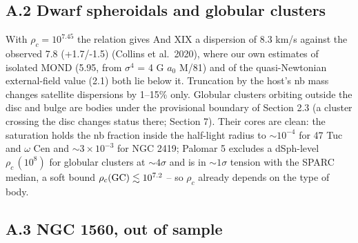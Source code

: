 \documentclass[
  10pt,
]{article}
\begin{document}
\subsection{A.2 Dwarf spheroidals and globular clusters}\label{dwarf-spheroidals-and-globular-clusters}

With $\rho_c=10^{7.45}$ the relation gives And XIX a dispersion of 8.3 km/s
against the observed 7.8 (+1.7/-1.5) (Collins et al.~2020), where our own estimates of isolated MOND (5.95, from
$\sigma^4$ = 4 G $a_0$ M/81) and of the quasi-Newtonian external-field
value (2.1) both lie below it.
Truncation by the host's nb mass changes satellite dispersions by 1--15\%
only. Globular clusters orbiting outside the disc and bulge are bodies under the provisional boundary of Section 2.3 (a cluster crossing the disc changes status there; Section 7). Their cores are clean: the
saturation holds the nb fraction inside the half-light radius to
$\sim10^{-4}$ for 47 Tuc and $\omega$ Cen and $\sim3\times10^{-3}$ for
NGC 2419; Palomar 5 excludes a dSph-level $\rho_c\,(10^{8})$ for globular clusters
at $\sim4\sigma$ and is in $\sim1\sigma$ tension with the SPARC median, a soft bound $\rho_c({\rm GC})\lesssim 10^{7.2}$ --
so $\rho_c$ already depends on the type of body.

\subsection{A.3 NGC 1560, out of sample}
\end{document}
